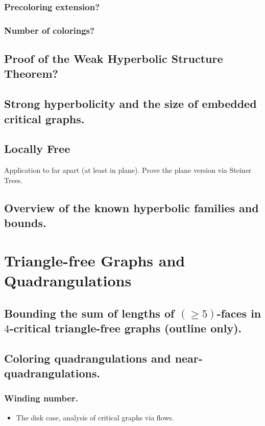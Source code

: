 \documentclass[12pt,twoside,openright,a4paper]{book}
\begin{document}
\subsection{Precoloring extension?}
\subsection{Number of colorings? }

\section{Proof of the Weak Hyperbolic Structure Theorem?}

\section{Strong hyperbolicity and the size of embedded critical graphs.}

\section{Locally Free}

Application to far apart (at least in plane). Prove the plane version via Steiner Trees.

\section{Overview of the known hyperbolic families and bounds.}


\chapter{Triangle-free Graphs and Quadrangulations}


\section{Bounding the sum of lengths of $(\ge\!5)$-faces in $4$-critical triangle-free graphs (outline only).}
\section{Coloring quadrangulations and near-quadrangulations.}

\subsection{ Winding number.}
\begin{itemize}
\item The disk case, analysis of critical graphs via flows.
\end{itemize}
\end{document}
